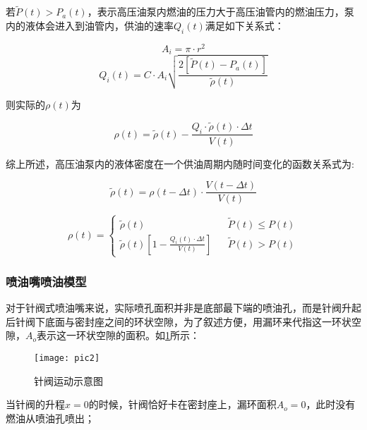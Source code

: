 \documentclass[withoutpreface,bwprint]{cumcmthesis} %
\begin{document}
若$\widetilde{P}(t)>  P_a(t)$，表示高压油泵内燃油的压力大于高压油管内的燃油压力，泵内的液体会进入到油管内，供油的速率$Q_i(t)$满足如下关系式：

\begin{equation}
A_i=\pi \cdot r^2
\end{equation}
\begin{equation} \label{eq:Qi(t)}
Q_i(t)=C\cdot A_i \sqrt{\frac{2[\widetilde{P}(t)-P_a(t)]}{\widetilde{\rho}(t)}}
\end{equation}

则实际的$\rho(t)$为

\begin{equation}
\rho(t)=\widetilde{\rho}(t)-\frac{Q_i \cdot\widetilde{\rho}(t) \cdot \Delta t}{V(t)}
\end{equation}

综上所述，高压油泵内的液体密度在一个供油周期内随时间变化的函数关系式为:


\begin{equation} \label{eq:32}
\widetilde{\rho}(t)=\rho(t-\Delta t) \cdot \frac{V(t-\Delta t)}{V(t)}
\end{equation}




\begin{equation} \label{eq:33}
\rho(t)=\left\{
\begin{array}{lcr}
\widetilde{\rho}(t) & & {\widetilde{P}(t)\le P(t)}\\
\widetilde{\rho}(t)[1-\frac{Q_i(t) \cdot  \Delta t}{V(t)} ]& & {\widetilde{P}(t)>P(t)}
\end{array}
\right.
\end{equation}





\subsubsection{喷油嘴喷油模型}

对于针阀式喷油嘴来说，实际喷孔面积并非是底部最下端的喷油孔，而是针阀升起后针阀下底面与密封座之间的环状空隙，为了叙述方便，用漏环来代指这一环状空隙，$A_o$表示这一环状空隙的面积。如\cref{fig:pic2}所示：
\begin{figure}[!h]
	\centering
	\texttt{[image: pic2]}
	\caption{针阀运动示意图}
	\label{fig:pic2}
\end{figure}

当针阀的升程$x=0$的时候，针阀恰好卡在密封座上，漏环面积$A_o=0$，此时没有燃油从喷油孔喷出；
\end{document}
